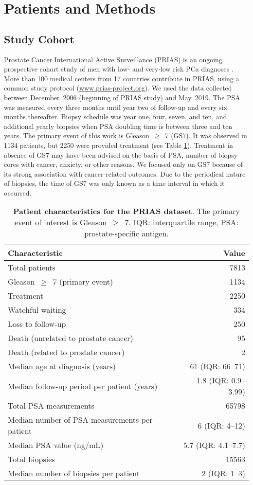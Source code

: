 \section{Patients and Methods}

\subsection{Study Cohort}
Prostate Cancer International Active Surveillance (PRIAS) is an ongoing prospective cohort study of men with low- and very-low risk PCa diagnoses \cite{bul2013active}. More than 100 medical centers from 17 countries contribute in PRIAS, using a common study protocol (\url{www.prias-project.org}). We used the data collected between December~2006 (beginning of PRIAS study) and May~2019. The PSA was measured every three months until year two of follow-up and every six months thereafter. Biopsy schedule was year one, four, seven, and ten, and additional yearly biopsies when PSA doubling time is between three and ten years. The primary event of this work is Gleason~$\geq$~7 (GS7). It was observed in 1134 patients, but 2250 were provided treatment (see Table \ref{table:prias_summary}). Treatment in absence of GS7 may have been advised on the basis of PSA, number of biopsy cores with cancer, anxiety, or other reasons. We focused only on GS7 because of its strong association with cancer-related outcomes. Due to the periodical nature of biopsies, the time of GS7 was only known as a time interval in which it occurred.

\begin{table}
\small\sf\centering
\caption{\textbf{Patient characteristics for the PRIAS dataset}. The primary event of interest is Gleason~$\geq$~7. IQR: interquartile range, PSA: prostate-specific antigen.}
\label{table:prias_summary}
\begin{tabular}{lr}
\hline
\hline
Characteristic & Value\\
\hline
Total patients & 7813\\
Gleason~$\geq$~7 (primary event) & 1134\\
Treatment & 2250\\
Watchful waiting & 334\\
Loss to follow-up & 250\\
Death (unrelated to prostate cancer) & 95\\
Death (related to prostate cancer) & 2\\
\hline
Median age at diagnosis (years) & 61 (IQR: 66--71)\\
Median follow-up period per patient (years) &  1.8 (IQR: 0.9--3.99)\\
Total PSA measurements & 65798\\
Median number of PSA measurements per patient &  6 (IQR: 4--12)\\
Median PSA value (ng/mL) & 5.7 (IQR: 4.1--7.7)\\
Total biopsies & 15563\\
Median number of biopsies per patient &  2 (IQR: 1--3)\\
\hline
\end{tabular}
\end{table}